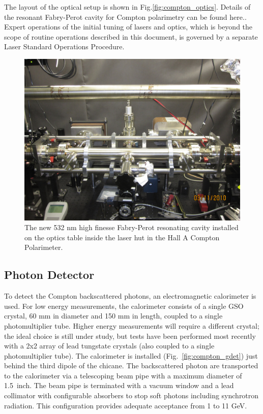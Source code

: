 The layout of the optical setup is shown in Fig.\ref{fig:compton_optics}.
Details of the resonant Fabry-Perot cavity for
Compton polarimetry can be found here.\cite{compton_IR_cavity_pub}.
 Expert operations of the initial tuning of lasers and optics, which is beyond the scope of routine operations described in this document,  is governed by a separate Laser Standard Operations Procedure\cite{compton_LSOP}.

\begin{figure}[htp]
    \begin{center}
        \includegraphics*[angle=0,width=\textwidth]{compton_fp_cavity}
    \end{center}
    \caption[compton:FP Cavity]{
            The new 532 nm high finesse Fabry-Perot resonating cavity installed on the optics table inside the laser hut in the Hall A Compton Polarimeter.
            }
    \label{fig:compton_cavity}
 \end{figure}

\subsection{Photon Detector}
To detect the Compton backscattered photons, an electromagnetic calorimeter is used. For low energy measurements, the calorimeter
consists of a single GSO crystal, 60 mm in diameter and 150 mm in length, coupled to a single photomultiplier tube. Higher energy
measurements will require a different crystal; the ideal choice is still under study, but tests have been performed most recently
with a 2x2 array of lead tungstate crystals (also coupled to a single photomultiplier tube). The calorimeter is installed
(Fig.~\ref{fig:compton_gdet})  just behind the third  dipole of the chicane. The backscattered photon are transported to the
calorimeter via a telescoping  beam pipe with a maximum diameter of  1.5~inch. The beam pipe is terminated with a vacuum window and
a lead collimator with configurable absorbers to stop soft photons including synchrotron radiation. This configuration
provides adequate acceptance from  1 to 11 GeV.  

